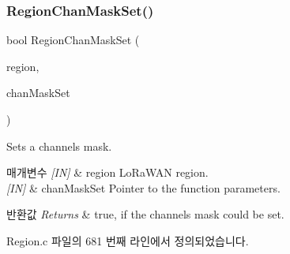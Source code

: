 \subsubsection{\texorpdfstring{Region\+Chan\+Mask\+Set()}{RegionChanMaskSet()}}
{\footnotesize\ttfamily bool Region\+Chan\+Mask\+Set (\begin{DoxyParamCaption}\item[{\mbox{\hyperlink{group___l_o_r_a_m_a_c_ga80c48efda9ae02e14b58160d34a798dd}{Lo\+Ra\+Mac\+Region\+\_\+t}}}]{region,  }\item[{\mbox{\hyperlink{group___r_e_g_i_o_n_ga6d24f7da136006410827dfb29f6b9b9e}{Chan\+Mask\+Set\+Params\+\_\+t}} $\ast$}]{chan\+Mask\+Set }\end{DoxyParamCaption})}



Sets a channels mask. 


\begin{DoxyParams}{매개변수}
{\em \mbox{[}\+I\+N\mbox{]}} & region Lo\+Ra\+W\+AN region.\\
\hline
{\em \mbox{[}\+I\+N\mbox{]}} & chan\+Mask\+Set Pointer to the function parameters.\\
\hline
\end{DoxyParams}

\begin{DoxyRetVals}{반환값}
{\em Returns} & true, if the channels mask could be set. \\
\hline
\end{DoxyRetVals}


Region.\+c 파일의 681 번째 라인에서 정의되었습니다.



